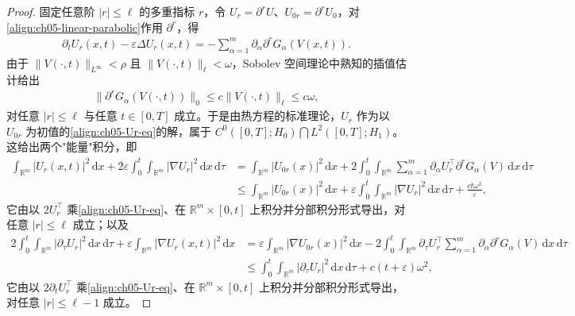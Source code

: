 \documentclass[../../main.tex]{subfiles}
\begin{document}
\begin{proof}
固定任意阶 $|r|\leqslant\ell$ 的多重指标 $r$，令 $U_{r}=\partial^{r}U$、$U_{0r}=\partial^{r}U_{0}$，对\eqref{align:ch05-linear-parabolic}作用 $\partial^{r}$，得
\begin{align}
\partial_{t}U_{r}(x,t)-\varepsilon\Delta U_{r}(x,t)=-\sum_{\alpha=1}^{m}\partial_{\alpha}\partial^{r}G_{\alpha}(V(x,t)).\label{align:ch05-Ur-eq}
\end{align}
由于 $\|V(\cdot,t)\|_{L^{\infty}}<\rho$ 且 $\|V(\cdot,t)\|_{\ell}<\omega$，Sobolev 空间理论中熟知的插值估计给出
\begin{align}
\|\partial^{r}G_{\alpha}(V(\cdot,t))\|_{0}\leqslant c\|V(\cdot,t)\|_{\ell}\leqslant c\omega,\label{align:ch05-Gr-interp}
\end{align}
对任意 $|r|\leqslant\ell$ 与任意 $t\in[0,T]$ 成立。于是由热方程的标准理论，$U_{r}$ 作为以 $U_{0r}$ 为初值的\eqref{align:ch05-Ur-eq}的解，属于 $C^{0}([0,T];H_{0})\bigcap L^{2}([0,T];H_{1})$。这给出两个"能量"积分，即
\begin{align}
\int_{\mathbb{R}^{m}}|U_{r}(x,t)|^{2}\,\mathrm{d}x+2\varepsilon\int_{0}^{t}\int_{\mathbb{R}^{m}}|\nabla U_{r}|^{2}\,\mathrm{d}x\,\mathrm{d}\tau
&=\int_{\mathbb{R}^{m}}|U_{0r}(x)|^{2}\,\mathrm{d}x+2\int_{0}^{t}\int_{\mathbb{R}^{m}}\sum_{\alpha=1}^{m}\partial_{\alpha}U_{r}^{\top}\partial^{r}G_{\alpha}(V)\,\mathrm{d}x\,\mathrm{d}\tau\nonumber\\
&\leqslant\int_{\mathbb{R}^{m}}|U_{0r}(x)|^{2}\,\mathrm{d}x+\varepsilon\int_{0}^{t}\int_{\mathbb{R}^{m}}|\nabla U_{r}|^{2}\,\mathrm{d}x\,\mathrm{d}\tau+\frac{ct\omega^{2}}{\varepsilon},\label{align:ch05-energy1}
\end{align}
它由以 $2U_{r}^{\top}$ 乘\eqref{align:ch05-Ur-eq}、在 $\mathbb{R}^{m}\times[0,t]$ 上积分并分部积分形式导出，对任意 $|r|\leqslant\ell$ 成立；以及
\begin{align}
2\int_{0}^{t}\int_{\mathbb{R}^{m}}|\partial_{\tau}U_{r}|^{2}\,\mathrm{d}x\,\mathrm{d}\tau+\varepsilon\int_{\mathbb{R}^{m}}|\nabla U_{r}(x,t)|^{2}\,\mathrm{d}x
&=\varepsilon\int_{\mathbb{R}^{m}}|\nabla U_{0r}(x)|^{2}\,\mathrm{d}x-2\int_{0}^{t}\int_{\mathbb{R}^{m}}\partial_{\tau}U_{r}^{\top}\sum_{\alpha=1}^{m}\partial_{\alpha}\partial^{r}G_{\alpha}(V)\,\mathrm{d}x\,\mathrm{d}\tau\nonumber\\
&\leqslant\int_{0}^{t}\int_{\mathbb{R}^{m}}|\partial_{\tau}U_{r}|^{2}\,\mathrm{d}x\,\mathrm{d}\tau+c(t+\varepsilon)\omega^{2},\label{align:ch05-energy2}
\end{align}
它由以 $2\partial_{t}U_{r}^{\top}$ 乘\eqref{align:ch05-Ur-eq}、在 $\mathbb{R}^{m}\times[0,t]$ 上积分并分部积分形式导出，对任意 $|r|\leqslant\ell-1$ 成立。


\end{proof}
\end{document}
